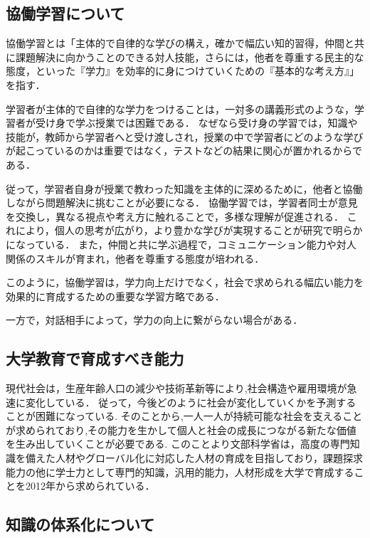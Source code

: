 \documentclass[12pt,a4j,titlepage]{ltjsarticle}
\begin{document}
\clearpage

\subsection{協働学習について}
協働学習とは「主体的で自律的な学びの構え，確かで幅広い知的習得，仲間と共に課題解決に向かうことのできる対人技能，さらには，他者を尊重する民主的な態度，といった『学力』を効率的に身につけていくための『基本的な考え方』」を指す．

学習者が主体的で自律的な学力をつけることは，一対多の講義形式のような，学習者が受け身で学ぶ授業では困難である．
なぜなら受け身の学習では，知識や技能が，教師から学習者へと受け渡しされ，授業の中で学習者にどのような学びが起こっているのかは重要ではなく，テストなどの結果に関心が置かれるからである．


従って，学習者自身が授業で教わった知識を主体的に深めるために，他者と協働しながら問題解決に挑むことが必要になる．
協働学習では，学習者同士が意見を交換し，異なる視点や考え方に触れることで，多様な理解が促進される．
これにより，個人の思考が広がり，より豊かな学びが実現することが研究で明らかになっている．\cite{suzuki}
また，仲間と共に学ぶ過程で，コミュニケーション能力や対人関係のスキルが育まれ，他者を尊重する態度が培われる．

このように，協働学習は，学力向上だけでなく，社会で求められる幅広い能力を効果的に育成するための重要な学習方略である．

一方で，対話相手によって，学力の向上に繋がらない場合がある．

\subsection{大学教育で育成すべき能力}
現代社会は，生産年齢人口の減少や技術革新等により,社会構造や雇用環境が急速に変化している．
従って，今後どのように社会が変化していくかを予測することが困難になっている.
そのことから,一人一人が持続可能な社会を支えることが求められており,その能力を生かして個人と社会の成長につながる新たな価値を生み出していくことが必要である.
このことより文部科学省は，高度の専門知識を備えた人材やグローバル化に対応した人材の育成を目指しており，課題探求能力の他に学士力として専門的知識，汎用的能力，人材形成を大学で育成することを2012年から求められている．

\subsection{知識の体系化について}
\end{document}
